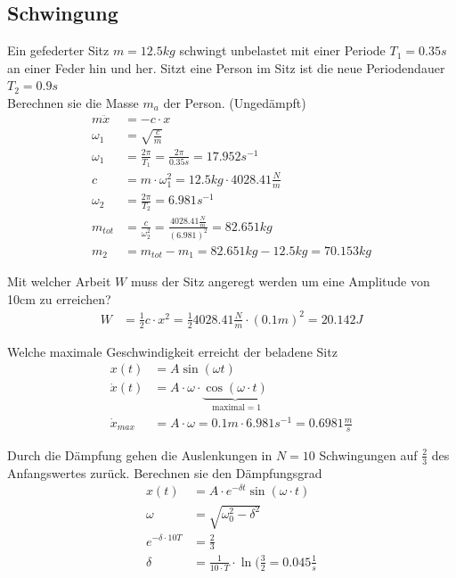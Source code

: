 \subsection{Schwingung}
Ein gefederter Sitz $m=12.5kg$ schwingt unbelastet mit einer Periode $T_1 = 0.35s$ an einer Feder hin und her. Sitzt eine Person im Sitz ist die neue Periodendauer $T_2 = 0.9s$\\
Berechnen sie die Masse $m_a$ der Person. (Ungedämpft)
\begin{align*}
	m\ddot{x} &= -c\cdot x\\
	\omega_1&= \sqrt{\frac{c}{m}}\\
	\omega_1&= \frac{2\pi}{T_1} = \frac{2\pi}{0.35s} = 17.952 s^{-1}\\
	c&= m\cdot \omega_1^2 = 12.5kg\cdot 4028.41\frac{N}{m}\\
	\omega_2 &= \frac{2\pi}{T_2} = 6.981s^{-1}\\
	m_{tot} &=\frac{c}{\omega_2^2} = \frac{4028.41 \frac{N}{m}}{(6.981)^2} = 82.651kg\\
	m_2 &= m_{tot} - m_1 = 82.651kg-12.5kg = 70.153kg
\end{align*}

Mit welcher Arbeit $W$ muss der Sitz angeregt werden um eine Amplitude von 10cm zu erreichen?
\begin{align*}
	W&=\frac{1}{2} c\cdot x^2 = \frac{1}{2} 4028.41\frac{N}{m} \cdot (0.1m)^2 = 20.142J
\end{align*}

Welche maximale Geschwindigkeit erreicht der beladene Sitz
\begin{align*}
	x(t) &= A\sin(\omega t)\\
	\dot{x}(t) &= A\cdot \omega	\cdot \underbrace{\cos(\omega\cdot t)}_{\textrm{ maximal} =1}\\
	\dot{x}_{max} &= A\cdot \omega = 0.1m \cdot 6.981s^{-1} = 0.6981\frac{m}{s}
\end{align*}

Durch die Dämpfung gehen die Auslenkungen in $N=10$ Schwingungen auf $\frac{2}{3}$ des Anfangswertes zurück. Berechnen sie den Dämpfungsgrad
\begin{align*}
	x(t) &= A\cdot e^{-\delta t} \sin(\omega \cdot t)\\
	\omega &= \sqrt{\omega_0^2 -\delta^2}\\
	e^{-\delta \cdot 10T} &= \frac{2}{3}\\
	\delta &= \frac{1}{10\cdot T} \cdot \ln(\frac{3}{2} = 0.045\frac{1}{s}
\end{align*}

